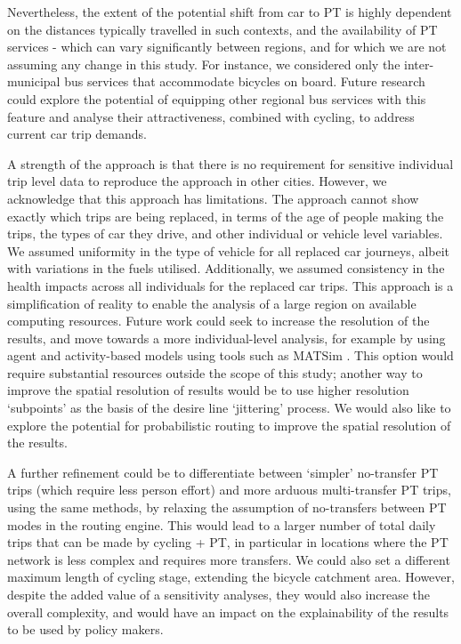 \documentclass[review, doubleblind, 3p,
authoryear]{elsarticle} %
\begin{document}
Nevertheless, the extent of the potential shift from car to PT is highly
dependent on the distances typically travelled in such contexts, and the
availability of PT services - which can vary significantly between
regions, and for which we are not assuming any change in this study. For
instance, we considered only the inter-municipal bus services that
accommodate bicycles on board. Future research could explore the
potential of equipping other regional bus services with this feature and
analyse their attractiveness, combined with cycling, to address current
car trip demands.

A strength of the approach is that there is no requirement for sensitive
individual trip level data to reproduce the approach in other cities.
However, we acknowledge that this approach has limitations. The approach
cannot show exactly which trips are being replaced, in terms of the age
of people making the trips, the types of car they drive, and other
individual or vehicle level variables. We assumed uniformity in the type
of vehicle for all replaced car journeys, albeit with variations in the
fuels utilised. Additionally, we assumed consistency in the health
impacts across all individuals for the replaced car trips. This approach
is a simplification of reality to enable the analysis of a large region
on available computing resources. Future work could seek to increase the
resolution of the results, and move towards a more individual-level
analysis, for example by using agent and activity-based models using
tools such as MATSim \citep{MATSim}. This option would require
substantial resources outside the scope of this study; another way to
improve the spatial resolution of results would be to use higher
resolution `subpoints' as the basis of the desire line `jittering'
process. We would also like to explore the potential for probabilistic
routing to improve the spatial resolution of the results.

A further refinement could be to differentiate between `simpler'
no-transfer PT trips (which require less person effort) and more arduous
multi-transfer PT trips, using the same methods, by relaxing the
assumption of no-transfers between PT modes in the routing engine. This
would lead to a larger number of total daily trips that can be made by
cycling + PT, in particular in locations where the PT network is less
complex and requires more transfers. We could also set a different
maximum length of cycling stage, extending the bicycle catchment area.
However, despite the added value of a sensitivity analyses, they would
also increase the overall complexity, and would have an impact on the
explainability of the results to be used by policy makers.
\end{document}
